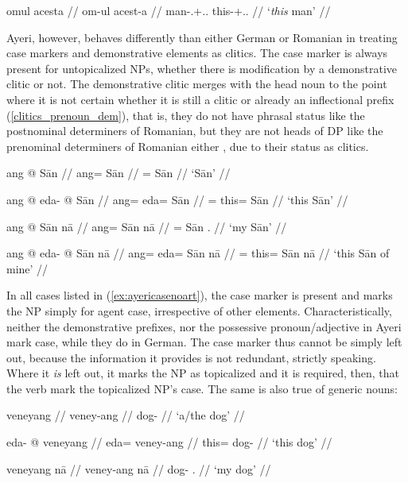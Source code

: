 	\a \begingl
		\gla omul acesta //
		\glb om-ul acest-a //
		\glc man-\Def{}.\Nom{}+\Acc{}.\Sg{}.\M{} 
			this-\Nom{}+\Acc{}.\Sg{}.\M{} //
		\glft `\emph{this} man' //
	\endgl
\xe

Ayeri, however, behaves differently than either German or Romanian in treating
case markers and demonstrative elements as clitics. The case marker is always
present for untopicalized NPs, whether there is modification by a demonstrative
clitic or not. The demonstrative clitic merges with the head noun to the point
where it is not certain whether it is still a clitic or already an inflectional
prefix (\autoref{clitics_prenoun_dem}), that is, they do not have phrasal
status like the postnominal determiners of Romanian, but they are not heads of
DP like the prenominal determiners of Romanian either 
\citep[299]{dindelegan2013}, due to their status as clitics.

\pex\label{ex:ayericasenoart}
	\a
	\begingl
		\gla ang @ Sān //
		\glb ang= Sān //
		\glc \Aarg{}= Sān //
		\glft `Sān' //
	\endgl

	\a\begingl
		\gla ang @ eda- @ Sān //
		\glb ang= eda= Sān //
		\glc \Aarg{}= this= Sān //
		\glft `this Sān' //
	\endgl

	\a\label{ex:naaadj}\begingl
		\gla ang @ Sān nā //
		\glb ang= Sān nā //
		\glc \Aarg{}= Sān \Fsg{}.\Gen{} //
		\glft `my Sān' //
	\endgl

	\a\ljudge\ques\begingl
		\gla ang @ eda- @ Sān nā //
		\glb ang= eda= Sān nā //
		\glc \Aarg{}= this= Sān nā //
		\glft `this Sān of mine' //
	\endgl
\xe

In all cases listed in (\ref{ex:ayericasenoart}), the case marker is present
and marks the NP simply for agent case, irrespective of other elements.
Characteristically, neither the demonstrative prefixes, nor the possessive
pronoun/adjective in Ayeri mark case, while they do in German. The case marker
thus cannot be simply left out, because the information it provides is not
redundant, strictly speaking. Where it \emph{is} left out, it marks the NP as
topicalized and it is required, then, that the verb mark the topicalized NP's
case. The same is also true of generic nouns:

\pex
	\a
	\begingl
		\gla veneyang //
		\glb veney-ang //
		\glc dog-\Aarg{} //
		\glft `a/the dog' //
	\endgl

	\a\begingl
		\gla eda- @ veneyang //
		\glb eda= veney-ang //
		\glc this= dog-\Aarg{} //
		\glft `this dog' //
	\endgl

	\a\begingl
		\gla veneyang nā //
		\glb veney-ang nā //
		\glc dog-\Aarg{} \Fsg{}.\Gen{} //
		\glft `my dog' //
	\endgl

